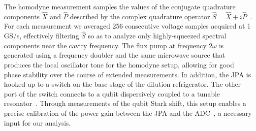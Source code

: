 \documentclass[pra,twocolumn,superscriptaddress]{revtex4-1}
\begin{document}
The homodyne measurement samples the values of the conjugate quadrature components $\hat{X}$ and $\hat{P}$ described by the complex quadrature operator $\hat{S} = \hat{X}+i\hat{P}$~\cite{Silva:2010mi}. For each measurement we averaged 256 consecutive voltage samples acquired at 1 GS/s, effectively filtering $\hat{S}$ so as to analyze only highly-squeezed spectral components near the cavity frequency. The flux pump at frequency 2$\omega$ is generated using a frequency doubler and the same microwave source that produces the local oscillator tone for the homodyne setup, allowing for good phase stability over the course of extended measurements. In addition, the JPA is hooked up to a switch on the base stage of the dilution refrigerator. The other port of the switch connects to a qubit dispersively coupled to a tunable resonator~\cite{Ong_PRL_2011}.  Through measurements of the qubit Stark shift, this setup enables a precise calibration of the power gain between the JPA and the ADC~\cite{Macklin_Science_2015}, a necessary input for our analysis.
\end{document}
